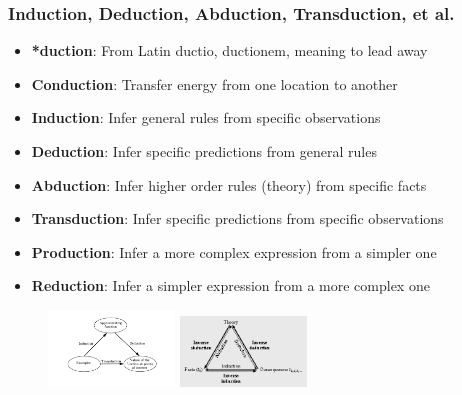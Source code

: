 \documentclass{beamer}
\begin{document}
\begin{frame}
  \frametitle{Induction, Deduction, Abduction, Transduction, et al.}
  \begin{itemize}
    \item \textbf{*duction}: From Latin ductio, ductionem, meaning to lead away
    \item \textbf{Conduction}: Transfer energy from one location to another
    \item \textbf{Induction}: Infer general rules from specific observations
    \item \textbf{Deduction}: Infer specific predictions from general rules
    \item \textbf{Abduction}: Infer higher order rules (theory) from specific facts
    \item \textbf{Transduction}: Infer specific predictions from specific observations
    \item \textbf{Production}: Infer a more complex expression from a simpler one
    \item \textbf{Reduction}: Infer a simpler expression from a more complex one
  \end{itemize}
  \begin{figure}[H]
    \centering
    \includegraphics[width=0.3\textwidth]{../../clipart/induction_deduction_transduction.png}
    \includegraphics[width=0.3\textwidth]{../../clipart/induction_deduction_abduction.png}
  \end{figure}
\end{frame}
\end{document}
